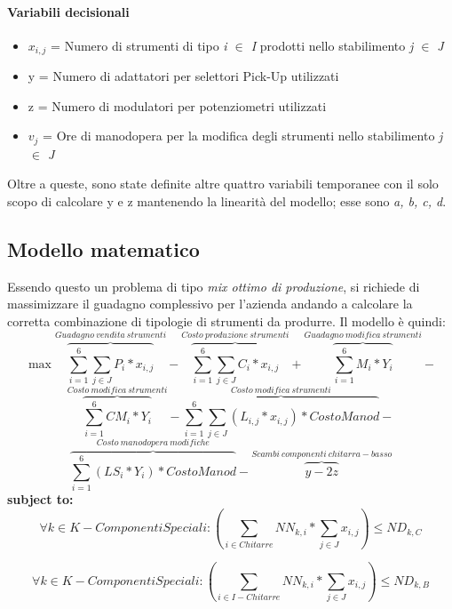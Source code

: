 \paragraph*{Variabili decisionali}
\begin{itemize}
\item[] $x_{i,j}$ = Numero di strumenti di tipo \textit{i $\in$ I} prodotti nello stabilimento \textit{j $\in$ J}
\item[] y = Numero di adattatori per selettori Pick-Up utilizzati
\item[] z = Numero di modulatori per potenziometri utilizzati
\item[] $v_j$ = Ore di manodopera per la modifica degli strumenti nello stabilimento \textit{j $\in$ J}
\end{itemize}
Oltre a queste, sono state definite altre quattro variabili temporanee con il solo scopo di calcolare y e z mantenendo la linearità del modello; esse sono \textit{a, b, c, d}.

\subsection{Modello matematico}
Essendo questo un problema di tipo \textit{mix ottimo di produzione}, si richiede di massimizzare il guadagno complessivo per l'azienda andando a calcolare la corretta combinazione di tipologie di strumenti da produrre. Il modello è quindi:
\[
\max \overbrace{\sum_{i=1}^{6} \sum_{j\in J} P_i*x_{i,j}}^{Guadagno\ vendita\ strumenti} - \overbrace{\sum_{i=1}^{6} \sum_{j\in J} C_i*x_{i,j}}^{Costo\ produzione\ strumenti} + \overbrace{\sum_{i=1}^{6} M_i*Y_i}^{Guadagno\ modifica\ strumenti} -\]
\[
\overbrace{\sum_{i=1}^{6} CM_i*Y_i}^{Costo\ modifica\ strumenti} - \overbrace{\sum_{i=1}^{6} \sum_{j\in J} (L_{i,j}*x_{i,j})*CostoManod}^{Costo\ modifica\ strumenti} -
\]
\[
\overbrace{\sum_{i=1}^{6} (LS_i*Y_i)*CostoManod}^{Costo\ manodopera\ modifiche} - \overbrace{y - 2z}^{Scambi\ componenti\ chitarra-basso}
\]
\textbf{subject to:} \\
\begin{equation} 
\label{vinc1}
\forall k \in K - ComponentiSpeciali : \left ( \sum_{i\in Chitarre} NN_{k,i}* \sum_{j\in J} x_{i,j} \right) \le ND_{k,C}
\end{equation}

\begin{equation} 
\label{vinc2}
\forall k \in K - ComponentiSpeciali : \left ( \sum_{i\in I-Chitarre} NN_{k,i}* \sum_{j\in J} x_{i,j} \right) \le ND_{k,B}
\end{equation}

